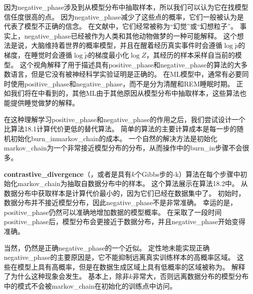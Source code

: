 
因为\gls{negative_phase}涉及到从模型分布中抽取样本，所以我们可以认为它在找模型信任度很高的点。
因为\gls{negative_phase}减少了这些点的概率，它们一般被认为是代表了模型不正确的信念。
在文献中，它们经常被称为``幻觉''或``幻想粒子''。
事实上，\gls{negative_phase}已经被作为人类和其他动物做梦的一种可能解释\citep{CrickMitchison83}。
这个想法是说，大脑维持着世界的概率模型，并且在醒着经历真实事件时会遵循$\log \tilde{p}$的梯度，在睡觉时会遵循$\log \tilde{p}$的梯度最小化$\log Z$，其经历的样本采样自当前的模型。
这个视角解释了用于描述具有\gls{positive_phase}和\gls{negative_phase}的算法的大多数语言，但是它没有被神经科学实验证明是正确的。
在\gls{ML}模型中，通常有必要同时使用\gls{positive_phase}和\gls{negative_phase}，而不是分为清醒和REM睡眠时期。
正如我们将在中看到的，其他\gls{ML}由于其他原因从模型分布中抽取样本，这些算法也能提供睡觉做梦的解释。


在这种理解学习\gls{positive_phase}和\gls{negative_phase}的作用之后，我们尝试设计一个比算法18.1计算代价更低的替代算法。
简单的算法的主要计算成本是每一步的随机初始化\gls{burn_in}\gls{markov_chain}的成本。
一个自然的解决方法是初始化\gls{markov_chain}为一个非常接近模型分布的分布，从而操作中的\gls{burn_in}步骤不会很多。


\textbf{\gls{contrastive_divergence}}（，或者是具有$k$个Gibbs步的-k）算法在每个步骤中初始化\gls{markov_chain}为抽取自数据分布中的样本\citep{Hinton-PoE-2000,Hinton-RBMguide-small}。
这个算法展示在算法18.2中。
从数据分布中获取样本是计算代价最小的，因为它们已经在数据集中了。
初始时，数据分布并不接近模型分布，因此\gls{negative_phase}不是非常准确。
幸运的是，\gls{positive_phase}仍然可以准确地增加数据的模型概率。
在采取了一段时间\gls{positive_phase}后，模型分布会更接近于数据分布，并且\gls{negative_phase}开始变得准确。


当然，仍然是正确\gls{negative_phase}的一个近似。
定性地未能实现正确\gls{negative_phase}的主要原因是，它不能抑制远离真实训练样本的高概率区域。
这些在模型上具有高概率，但是在数据生成区域上具有低概率的区域被称为。
解释了为什么这种现象会发生。
基本上，除非$k$非常大，否则远离数据分布的模型分布中的模式不会被\gls{markov_chain}在初始化的训练点中访问。



